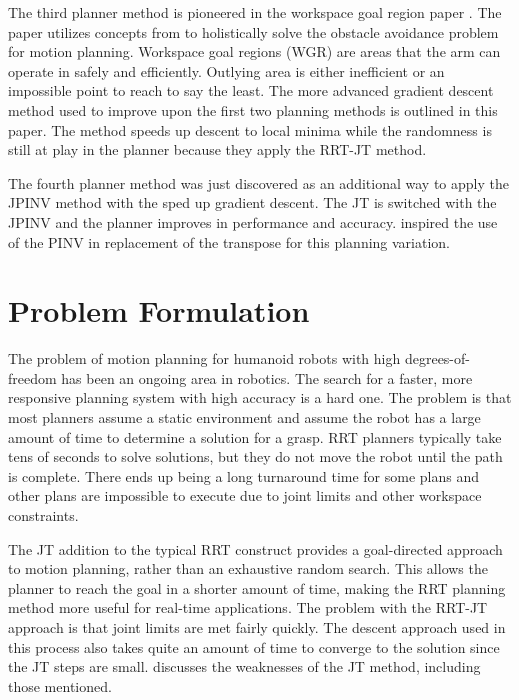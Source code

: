 \documentclass[conference]{IEEEtran} \usepackage[T1]{fontenc} \usepackage[backend=biber, style=ieee]{biblatex}
\begin{document}
The third planner method is pioneered in the workspace goal region paper \cite{wgr_planning}. The paper utilizes concepts from \cite{humanoid_motion_planning} to 
holistically solve the obstacle avoidance problem for motion planning. Workspace goal regions (WGR) are areas that the arm can operate in safely and efficiently. 
Outlying area is either inefficient or an impossible point to reach to say the least. The more advanced gradient descent method used to improve upon the first 
two planning methods is outlined in this paper. The method speeds up descent to local minima while the randomness is still at play in the planner because they 
apply the RRT-JT method.  

The fourth planner method was just discovered as an additional way to apply the JPINV method with the sped up gradient descent. The JT is switched with the 
JPINV and the planner improves in performance and accuracy. \cite{humanoid_motion_planning} inspired the use of the PINV in replacement of the transpose for this 
planning variation.

\section{Problem Formulation} \label{Problem Formulation}

The problem of motion planning for humanoid robots with high degrees-of-freedom has been an ongoing area in robotics. The search for a faster, more responsive
planning system with high accuracy is a hard one. The problem is that most planners assume a static environment and assume the robot has a large amount of time
to determine a solution for a grasp. RRT planners typically take tens of seconds to solve solutions, but they do not move the robot until the path is complete.
There ends up being a long turnaround time for some plans and other plans are impossible to execute due to joint limits and other workspace constraints.

The JT addition to the typical RRT construct provides a goal-directed approach to motion planning, rather than an exhaustive random search. This allows the
planner to reach the goal in a shorter amount of time, making the RRT planning method more useful for real-time applications. The problem with the RRT-JT 
approach is that joint limits are met fairly quickly. The descent approach used in this process also takes quite an amount of time to converge to the solution 
since the JT steps are small. \cite{humanoid_motion_planning} discusses the weaknesses of the JT method, including those mentioned.
\end{document}

